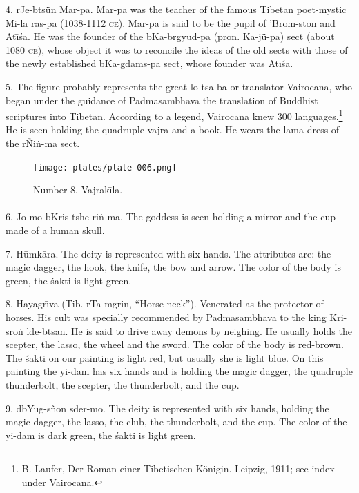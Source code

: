 \documentclass[a4paper, 12pt, oneside]{article}
\begin{document}
4. rJe-btsün Mar-pa. Mar-pa was the teacher of the famous Tibetan poet-mystic Mi-la ras-pa (1038-1112 \textsc{ce}). Mar-pa is said to be the pupil of 'Brom-ston and At\={\i}\'{s}a. He was the founder of the bKa-brgyud-pa (pron. Ka-jü-pa) sect (about 1080 \textsc{ce}), whose object it was to reconcile the ideas of the old sects with those of the newly established bKa-gdams-pa sect, whose founder was At\={\i}\'{s}a.

5. The figure probably represents the great lo-tsa-ba or translator Vairocana, who began under the guidance of Padmasambhava the translation of Buddhist scriptures into Tibetan. According to a legend, Vairocana knew 300 languages.\footnote{B. Laufer, Der Roman einer Tibetischen Königin. Leipzig, 1911; see index under Vairocana.} He is seen holding the quadruple vajra and a book. He wears the lama dress of the rÑi\.{n}-ma sect.
\clearpage
\vspace*{\fill}
\begin{figure}[H]
\centering
\texttt{[image: plates/plate-006.png]}
\caption*{Number 8. Vajrak\={\i}la.}
\end{figure}
\vspace*{\fill}
\clearpage
\paragraph{}
6. Jo-mo bKris-tshe-ri\.{n}-ma. The goddess is seen holding a mirror and the cup made of a human skull.

7. H\={u}mk\={a}ra. The deity is represented with six hands. The attributes are: the magic dagger, the hook, the knife, the bow and arrow. The color of the body is green, the \'{s}akti is light green.

8. Hayagr\={\i}va (Tib. rTa-mgrin, ``Horse-neck''). Venerated as the protector of horses. His cult was specially recommended by Padmasambhava to the king Kri-sro\.{n} lde-btsan. He is said to drive away demons by neighing. He usually holds the scepter, the lasso, the wheel and the sword. The color of the body is red-brown. The \'{s}akti on our painting is light red, but usually she is light blue. On this painting the yi-dam has six hands and is holding the magic dagger, the quadruple thunderbolt, the scepter, the thunderbolt, and the cup.

9. dbYug-s\~{n}on sder-mo. The deity is represented with six hands, holding the magic dagger, the lasso, the club, the thunderbolt, and the cup. The color of the yi-dam is dark green, the \'{s}akti is light green.
\end{document}
